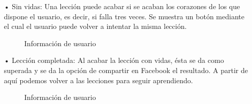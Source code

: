 \begin{itemize}

\item[•]Sin vidas: Una lección puede acabar si se acaban los corazones de los que dispone el usuario, es decir, si falla tres veces. Se muestra un botón mediante el cual el usuario puede volver a intentar la misma lección.

\begin{figure}[H]
\begin{center}
\caption{Información de usuario\label{fig:usuario}}
\end{center}
\end{figure}

\item[•]Lección completada: Al acabar la lección con vidas, ésta se da como superada y se da la opción de compartir en Facebook el resultado. A partir de aquí podemos volver a las lecciones para seguir aprendiendo.

\begin{figure}[H]
\begin{center}
\caption{Información de usuario\label{fig:usuario}}
\end{center}
\end{figure}


\end{itemize}
